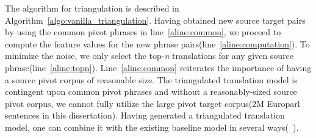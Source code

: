 The algorithm for triangulation is described in Algorithm~\ref{algo:vanilla_triangulation}. Having obtained new source target pairs by using the common pivot phrases in line~\ref{aline:common}, we proceed to compute the feature values for the new phrase pairs(line~\ref{aline:computation}). To minimize the noise, we only select the top-\emph{n} translations for any given source phrase(line~\ref{aline:topn}). Line~\ref{aline:common} reiterates the importance of having a source pivot corpus of reasonable size. The triangulated translation model is contingent upon common pivot phrases and without a reasonably-sized source pivot corpus, we cannot fully utilize the large pivot target corpus(2M Europarl sentences in this dissertation). Having generated a triangulated translation model, one can combine it with the existing baseline model in several ways(~\cite{Bertoldi:08, Nakov:12, Cohn:07}). 

